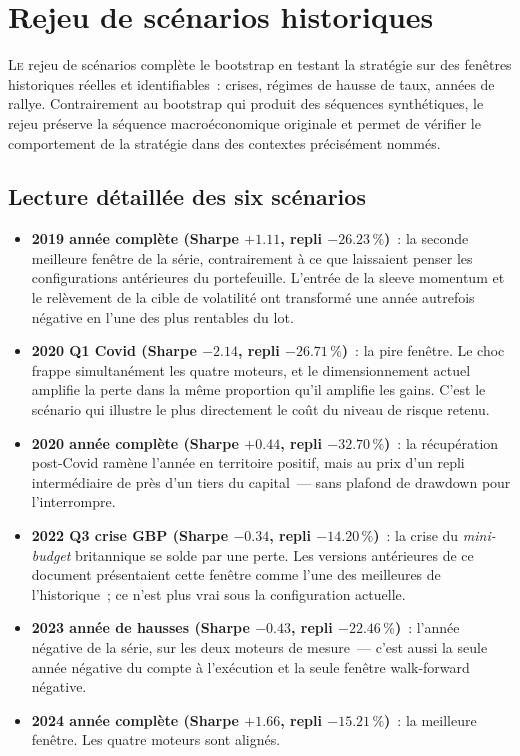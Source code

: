 \section{Rejeu de scénarios historiques}
\label{sec:scenarios}

\lettrine[lines=2, findent=2pt, nindent=0pt]{L}{e} rejeu de scénarios complète le bootstrap en testant la stratégie sur des fenêtres historiques réelles et identifiables~: crises, régimes de hausse de taux, années de rallye. Contrairement au bootstrap qui produit des séquences synthétiques, le rejeu préserve la séquence macroéconomique originale et permet de vérifier le comportement de la stratégie dans des contextes précisément nommés.



\subsection{Lecture détaillée des six scénarios}

\begin{itemize}
\item \textbf{2019 année complète (Sharpe $+1.11$, repli $-26.23\,\%$)}~: la seconde meilleure fenêtre de la série, contrairement à ce que laissaient penser les configurations antérieures du portefeuille. L'entrée de la sleeve momentum et le relèvement de la cible de volatilité ont transformé une année autrefois négative en l'une des plus rentables du lot.

\item \textbf{2020 Q1 Covid (Sharpe $-2.14$, repli $-26.71\,\%$)}~: la pire fenêtre. Le choc frappe simultanément les quatre moteurs, et le dimensionnement actuel amplifie la perte dans la même proportion qu'il amplifie les gains. C'est le scénario qui illustre le plus directement le coût du niveau de risque retenu.

\item \textbf{2020 année complète (Sharpe $+0.44$, repli $-32.70\,\%$)}~: la récupération post-Covid ramène l'année en territoire positif, mais au prix d'un repli intermédiaire de près d'un tiers du capital~--- sans plafond de drawdown pour l'interrompre.

\item \textbf{2022 Q3 crise GBP (Sharpe $-0.34$, repli $-14.20\,\%$)}~: la crise du \emph{mini-budget} britannique se solde par une perte. Les versions antérieures de ce document présentaient cette fenêtre comme l'une des meilleures de l'historique~; ce n'est plus vrai sous la configuration actuelle.

\item \textbf{2023 année de hausses (Sharpe $-0.43$, repli $-22.46\,\%$)}~: l'année négative de la série, sur les deux moteurs de mesure~--- c'est aussi la seule année négative du compte à l'exécution et la seule fenêtre walk-forward négative.

\item \textbf{2024 année complète (Sharpe $+1.66$, repli $-15.21\,\%$)}~: la meilleure fenêtre. Les quatre moteurs sont alignés.
\end{itemize}

